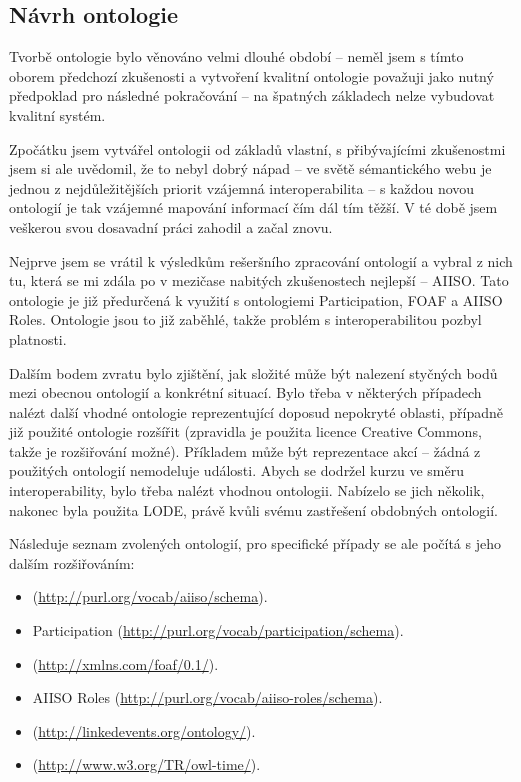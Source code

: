 \subsection{Návrh ontologie}
Tvorbě ontologie bylo věnováno velmi dlouhé období -- neměl jsem s tímto oborem předchozí zkušenosti a vytvoření kvalitní ontologie považuji jako nutný předpoklad pro následné pokračování -- na špatných základech nelze vybudovat kvalitní systém.

Zpočátku jsem vytvářel ontologii od základů vlastní, s přibývajícími zkušenostmi jsem si ale uvědomil, že to nebyl dobrý nápad -- ve světě sémantického webu je jednou z nejdůležitějších priorit vzájemná interoperabilita -- s každou novou ontologií je tak vzájemné mapování informací čím dál tím těžší. V té době jsem veškerou svou dosavadní práci zahodil a začal znovu.

Nejprve jsem se vrátil k výsledkům rešeršního zpracování ontologií a vybral z nich tu, která se mi zdála po v mezičase nabitých zkušenostech nejlepší -- \gls{AIISO}. Tato ontologie je již předurčená k využití s ontologiemi Participation, \gls{FOAF} a AIISO Roles. Ontologie jsou to již zaběhlé, takže problém s interoperabilitou pozbyl platnosti.

Dalším bodem zvratu bylo zjištění, jak složité může být nalezení styčných bodů mezi obecnou ontologií a konkrétní situací. Bylo třeba v některých případech nalézt další vhodné ontologie reprezentující doposud nepokryté oblasti, případně již použité ontologie rozšířit (zpravidla je použita licence Creative Commons, takže je rozšiřování možné). Příkladem může být reprezentace akcí  -- žádná z použitých ontologií nemodeluje události. Abych se dodržel kurzu ve směru interoperability, bylo třeba nalézt vhodnou ontologii. Nabízelo se jich několik, nakonec byla použita \gls{LODE}, právě kvůli svému zastřešení obdobných ontologií.

Následuje seznam zvolených ontologií, pro specifické případy se ale počítá s jeho dalším rozšiřováním:
\begin{itemize}
 \item {} (\url{http://purl.org/vocab/aiiso/schema}).
 \item Participation (\url{http://purl.org/vocab/participation/schema}).
 \item {} (\url{http://xmlns.com/foaf/0.1/}).
 \item AIISO Roles (\url{http://purl.org/vocab/aiiso-roles/schema}).
 \item {} (\url{http://linkedevents.org/ontology/}).
 \item {} (\url{http://www.w3.org/TR/owl-time/}).
\end{itemize}


